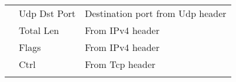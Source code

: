 \begin{table}[ht]
\begin{tabular}{lll}
\multicolumn{1}{|l|}{}                            & \multicolumn{1}{l|}{Udp Dst Port}  & \multicolumn{1}{l|}{Destination port from Udp header}                                                                                                    \\ \cline{2-3} 
\multicolumn{1}{|l|}{}                            & \multicolumn{1}{l|}{Total Len}     & \multicolumn{1}{l|}{From IPv4 header}                                                                                                                    \\ \cline{2-3} 
\multicolumn{1}{|l|}{}                            & \multicolumn{1}{l|}{Flags}         & \multicolumn{1}{l|}{From IPv4 header}                                                                                                                    \\ \cline{2-3} 
\multicolumn{1}{|l|}{}                            & \multicolumn{1}{l|}{Ctrl}          & \multicolumn{1}{l|}{From Tcp header}                                                                                                                     \\ \hline
                                                  &                                    &                                                                                                                                                         
\end{tabular}
\end{table}
\fi